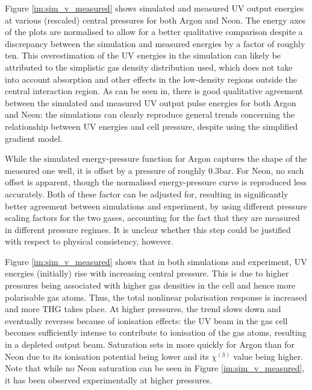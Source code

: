 \documentclass[a4paper]{jpconf}
\begin{document}
Figure \ref{im:sim_v_measured} shows simulated and measured UV output energies at various (rescaled) central pressures for both Argon and Neon. The energy axes of the plots are normalised to allow for a better qualitative comparison despite a discrepancy between the simulation and measured energies by a factor of roughly ten. This overestimation of the UV energies in the simulation can likely be attributed to the simplistic gas density distribution used, which does not take into account absorption and other effects in the low-density regions outside the central interaction region. As can be seen in, there is good qualitative agreement between the simulated and measured UV output pulse energies for both Argon and Neon: the simulations can clearly reproduce general trends concerning the relationship between UV energies and cell pressure, despite using the simplified gradient model. \par 
While the simulated energy-pressure function for Argon captures the shape of the measured one well, it is offset by a pressure of roughly 0.3bar. For Neon, no such offset is apparent, though the normalised energy-pressure curve is reproduced less accurately.   Both of these factor can be adjusted for, resulting in significantly better agreement between simulations and experiment, by using different pressure scaling factors for the two gases, accounting for the fact that they are measured in different pressure regimes. It is unclear whether this step could be justified with respect to physical consistency, however. \par 
Figure \ref{im:sim_v_measured} shows that in both simulations and experiment, UV energies (initially) rise with increasing central pressure. This is due to higher pressures being associated with higher gas densities in the cell and hence more polarisable gas atoms. Thus, the total nonlinear polarisation response is increased and more THG takes place. At higher pressures, the trend slows down and eventually reverses because of ionisation effects: the UV beam in the gas cell becomes sufficiently intense to contribute to ionisation of the gas atoms, resulting in a depleted output beam. Saturation sets in more quickly for Argon than for Neon due to its ionisation potential being lower and its $\chi^{(3)}$ value being higher. Note that while no Neon saturation can be seen in Figure \ref{im:sim_v_measured}, it has been observed experimentally at higher pressures.  \par 
\end{document}
